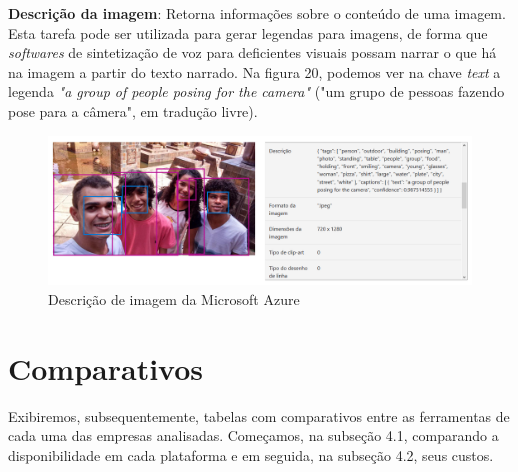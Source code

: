 \documentclass{article}
\begin{document}
\textbf{Descrição da imagem}: Retorna informações sobre o conteúdo de uma imagem. Esta tarefa pode ser utilizada para gerar legendas para imagens, de forma que \textit{softwares} de sintetização de voz para deficientes visuais possam narrar o que há na imagem a partir do texto narrado. Na figura 20, podemos ver na chave \textit{text} a legenda \textit{"a group of people posing for the camera"} ("um grupo de pessoas fazendo pose para a câmera", em tradução livre). \\
\begin{figure}[H]
    \centering
    \includegraphics[scale=0.25]{imagens/caption.png}
    \caption{Descrição de imagem da Microsoft Azure}
    \label{fig:captionalize}
\end{figure}{}

\section{Comparativos}

Exibiremos, subsequentemente, tabelas com comparativos entre as ferramentas de cada uma das empresas analisadas. Começamos, na subseção 4.1, comparando a disponibilidade em cada plataforma e em seguida, na subseção 4.2, seus custos.
\end{document}
